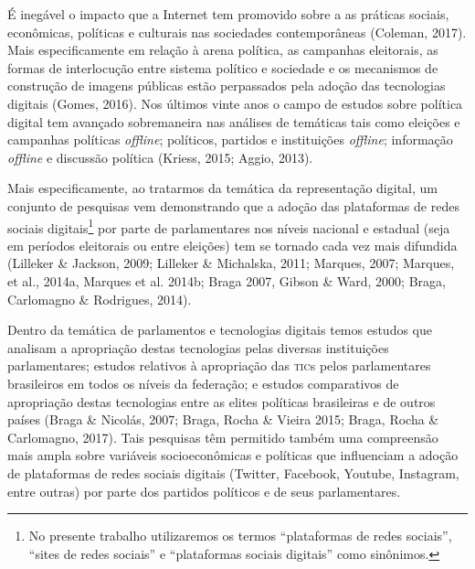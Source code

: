 

\noindent{}É inegável o impacto que a Internet tem promovido sobre a as práticas
sociais, econômicas, políticas e culturais nas sociedades contemporâneas
(Coleman, 2017). Mais especificamente em relação à arena política, as
campanhas eleitorais, as formas de interlocução entre sistema político e
sociedade e os mecanismos de construção de imagens públicas estão
perpassados pela adoção das tecnologias digitais (Gomes, 2016). Nos
últimos vinte anos o campo de estudos sobre política digital tem
avançado sobremaneira nas análises de temáticas tais como eleições e
campanhas políticas \emph{offline}; políticos, partidos e instituições \emph{offline};
informação \emph{offline} e discussão política (Kriess, 2015; Aggio, 2013).

Mais especificamente, ao tratarmos da temática da representação digital,
um conjunto de pesquisas vem demonstrando que a adoção das plataformas
de redes sociais digitais\footnote{No presente trabalho utilizaremos os
  termos ``plataformas de redes sociais'', ``sites de redes sociais'' e
  ``plataformas sociais digitais'' como sinônimos.} por parte de
parlamentares nos níveis nacional e estadual (seja em períodos
eleitorais ou entre eleições) tem se tornado cada vez mais difundida
(Lilleker \& Jackson, 2009; Lilleker \& Michalska, 2011; Marques, 2007;
Marques, et al., 2014a, Marques et al. 2014b; Braga 2007, Gibson \&
Ward, 2000; Braga, Carlomagno \& Rodrigues, 2014).

Dentro da temática de parlamentos e tecnologias digitais temos estudos
que analisam a apropriação destas tecnologias pelas diversas
instituições parlamentares; estudos relativos à apropriação das \textsc{tic}s
pelos parlamentares brasileiros em todos os níveis da federação; e
estudos comparativos de apropriação destas tecnologias entre as elites
políticas brasileiras e de outros países (Braga \& Nicolás, 2007; Braga,
Rocha \& Vieira 2015; Braga, Rocha \& Carlomagno, 2017). Tais pesquisas
têm permitido também uma compreensão mais ampla sobre variáveis
socioeconômicas e políticas que influenciam a adoção de plataformas de
redes sociais digitais (Twitter, Facebook, Youtube, Instagram, entre
outras) por parte dos partidos políticos e de seus parlamentares.

